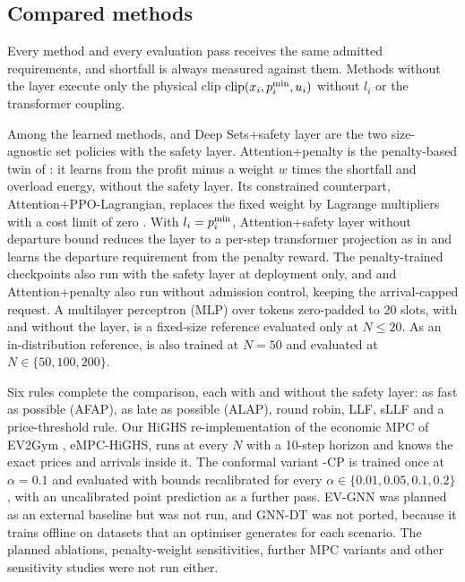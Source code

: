 \subsection{Compared methods}\label{sec:baselines}

Every method and every evaluation pass receives the same admitted requirements, and shortfall is always measured against them.
Methods without the layer execute only the physical clip $\operatorname{clip}(x_i,p^{\min}_i,u_i)$ without $l_i$ or the transformer coupling.

Among the learned methods, \method{} and Deep Sets+safety layer are the two size-agnostic set policies with the safety layer.
Attention+penalty is the penalty-based twin of \method{}: it learns from the profit minus a weight $w$ times the shortfall and overload energy, without the safety layer.
Its constrained counterpart, Attention+PPO-Lagrangian, replaces the fixed weight by Lagrange multipliers with a cost limit of zero \cite{altman2021constrained,tessler2018reward}.
With $l_i=p^{\min}_i$, Attention+safety layer without departure bound reduces the layer to a per-step transformer projection as in \cite{wan2025logicinformed} and learns the departure requirement from the penalty reward.
The penalty-trained checkpoints also run with the safety layer at deployment only, and \method{} and Attention+penalty also run without admission control, keeping the arrival-capped request.
A multilayer perceptron (MLP) over tokens zero-padded to 20 slots, with and without the layer, is a fixed-size reference evaluated only at $N\le20$.
As an in-distribution reference, \method{} is also trained at $N=50$ and evaluated at $N\in\{50,100,200\}$.

Six rules complete the comparison, each with and without the safety layer: as fast as possible (AFAP), as late as possible (ALAP), round robin, LLF, sLLF \cite{chen2022smoothed} and a price-threshold rule.
Our HiGHS re-implementation of the economic MPC of EV2Gym \cite{diazlondono2026open}, eMPC-HiGHS, runs at every $N$ with a 10-step horizon and knows the exact prices and arrivals inside it.
The conformal variant \method{}-CP is trained once at $\alpha=0.1$ and evaluated with bounds recalibrated for every $\alpha\in\{0.01,0.05,0.1,0.2\}$, with an uncalibrated point prediction as a further pass.
EV-GNN \cite{orfanoudakis2025scalable} was planned as an external baseline but was not run, and GNN-DT \cite{orfanoudakis2026graph} was not ported, because it trains offline on datasets that an optimiser generates for each scenario.
The planned ablations, penalty-weight sensitivities, further MPC variants and other sensitivity studies were not run either.

